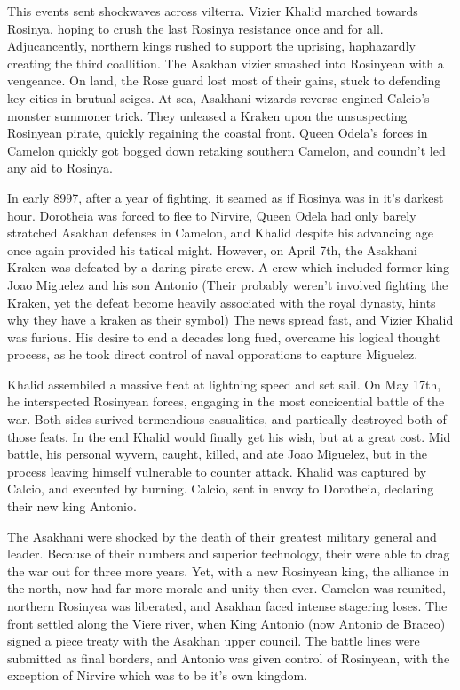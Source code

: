 \documentclass[../main.tex]{subfiles}
\begin{document}
This events sent shockwaves across vilterra. Vizier Khalid marched towards Rosinya, hoping to crush the last Rosinya
resistance once and for all. Adjucancently, northern kings rushed to support the uprising, haphazardly creating the 
third coallition. The Asakhan vizier smashed into Rosinyean with a vengeance. On land, the Rose guard lost most of their
gains, stuck to defending key cities in brutual seiges. At sea, Asakhani wizards reverse engined Calcio's monster summoner
trick. They unleased a Kraken upon the unsuspecting Rosinyean pirate, quickly regaining the coastal front. Queen Odela's
forces in Camelon quickly got bogged down retaking southern Camelon, and coundn't led any aid to Rosinya.

In early 8997, after a year of fighting, it seamed as if Rosinya was in it's darkest hour. Dorotheia was forced to flee 
to Nirvire, Queen Odela had only barely stratched Asakhan defenses in Camelon, and Khalid despite his advancing age once
again provided his tatical might. However, on April 7th, the Asakhani Kraken was defeated by a daring pirate crew. A crew
which included former king Joao Miguelez and his son Antonio (Their probably weren't involved fighting the Kraken,
yet the defeat become heavily associated with the royal dynasty, hints why they have a kraken as their symbol) The news 
spread fast, and Vizier Khalid was furious. His desire to end a decades long fued, overcame his logical thought process,
as he took direct control of naval opporations to capture Miguelez. 

Khalid assembiled a massive fleat at lightning speed and set sail. On May 17th, he interspected Rosinyean forces, engaging
in the most concicential battle of the war. Both sides surived termendious casualities, and partically destroyed both of 
those feats. In the end Khalid would finally get his wish, but at a great cost. Mid battle, his personal wyvern, caught, 
killed, and ate Joao Miguelez, but in the process leaving himself vulnerable to counter attack. Khalid was captured by 
Calcio, and executed by burning. Calcio, sent in envoy to Dorotheia, declaring their new king Antonio. 

The Asakhani were shocked by the death of their greatest military general and leader. Because of their numbers and
superior technology, their were able to drag the war out for three more years. Yet, with a new Rosinyean king, the 
alliance in the north, now had far more morale and unity then ever. Camelon was reunited, northern Rosinyea was
liberated, and Asakhan faced intense stagering loses. The front settled along the Viere river, when King Antonio 
(now Antonio de Braceo) signed a piece treaty with the Asakhan upper council. The battle lines were submitted as final
borders, and Antonio was given control of Rosinyean, with the exception of Nirvire which was to be it's own kingdom.
\end{document}
